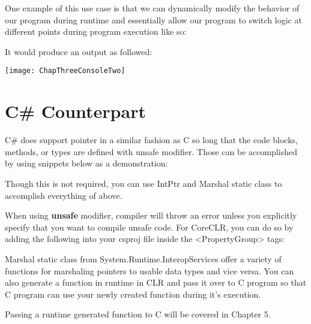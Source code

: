 One example of this use case is that we can dynamically modify the behavior of our program during runtime and essentially allow our program to switch logic at different points during program execution like so:

\newpage
It would produce an output as followed:

\texttt{[image: ChapThreeConsoleTwo]}
\newpage
\section{C\# Counterpart}
C\# does support pointer in a similar fashion as C so long that the code blocks, methods, or types are defined with unsafe modifier. Those can be accomplished by using snippets below as a demonstration:




Though this is not required, you can use IntPtr and Marshal static class to accomplish everything of above.

When using \textbf{unsafe} modifier, compiler will throw an error unless you explicitly specify that you want to compile unsafe code. For CoreCLR, you can do so by adding the following into your csproj file inside the  <PropertyGroup> tags:



Marshal static class from System.Runtime.InteropServices offer a variety of functions for marshaling pointers to usable data types and vice versa. You can also generate a function in runtime in CLR and pass it over to C program so that C program can use your newly created function during it's execution.

Passing a runtime generated function to C will be covered in Chapter 5.
